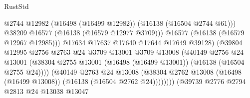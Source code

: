\begin{lexlean}{RustStd}
\begin{coremodule}
                                                @2744
                                                @12982
                                                (@16498 (@16499 @12982))
                                                (@16138 (@16504 @2744 @61)))
                                              @38209
                                              @16577
                                              (@16138 (@16579 @12977 @3709)))
                                            @16577
                                            (@16138 (@16579 @12967 @12985)))
                                          @17634
                                          @17637
                                          @17640
                                          @17644
                                          @17649
                                          @39128)
                                        (@39804
                                          @12995
                                          @2756
                                          @2763
                                          @24
                                          @3709
                                          @13001
                                          @3709
                                          @13008
                                          (@40149
                                            @2756
                                            @24
                                            @13001
                                            (@38304
                                              @2755
                                              @13001
                                              (@16498 (@16499 @13001))
                                              (@16138 (@16504 @2755 @24))))
                                          (@40149
                                            @2763
                                            @24
                                            @13008
                                            (@38304
                                              @2762
                                              @13008
                                              (@16498 (@16499 @13008))
                                              (@16138 (@16504 @2762 @24))))))))
                                  (@39739
                                    @2776
                                    @2794
                                    @2813
                                    @24
                                    @13038
                                    @13047

\end{coremodule}
\end{lexlean}
